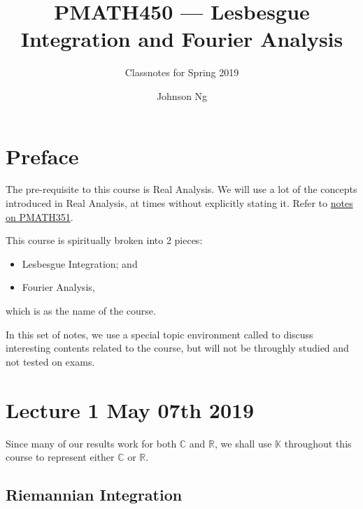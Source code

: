 \documentclass[notoc,notitlepage]{tufte-book}
\title{PMATH450 --- Lesbesgue Integration and Fourier Analysis}
\author{Johnson Ng}
\subtitle{Classnotes for Spring 2019}
\begin{document}


\chapter*{Preface}%
\label{chp:preface}

The pre-requisite to this course is Real Analysis. We will use a lot of the
concepts introduced in Real Analysis, at times without explicitly stating it.
Refer to \href{https://tex.japorized.ink/PMATH351F18/classnotes.pdf}{notes on
PMATH351}.

This course is spiritually broken into 2 pieces:
\begin{itemize}
  \item Lesbesgue Integration; and
  \item Fourier Analysis,
\end{itemize}
which is as the name of the course.

In this set of notes, we use a special topic environment called
 to discuss interesting contents related to the course, but
will not be throughly studied and not tested on exams.


\chapter{Lecture 1 May 07th 2019}%
\label{chp:lecture_1_may_07th_2019}

Since many of our results work for both $\mathbb{C}$ and $\mathbb{R}$, we shall
use $\mathbb{K}$ throughout this course to represent either $\mathbb{C}$ or
$\mathbb{R}$.

\section{Riemannian Integration}%
\label{sec:riemannian_integration}
\end{document}
